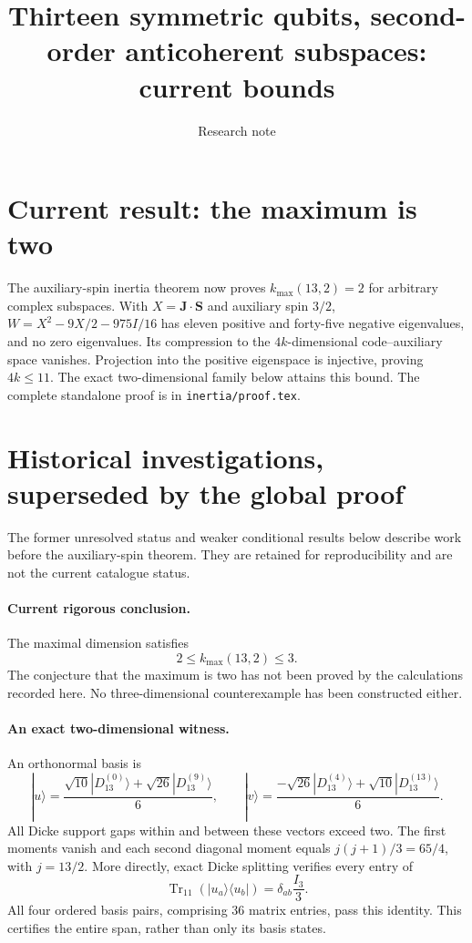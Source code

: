 \documentclass[11pt]{article}
\newcommand{\Tr}{\operatorname{Tr}}
\begin{document}
\section*{Current result: the maximum is two}
The auxiliary-spin inertia theorem now proves $k_{\max}(13,2)=2$ for arbitrary
complex subspaces. With $X=\mathbf J\cdot\mathbf S$ and auxiliary spin $3/2$,
$W=X^2-9X/2-975I/16$ has eleven positive and forty-five negative eigenvalues,
and no zero eigenvalues. Its compression to the $4k$-dimensional code--auxiliary
space vanishes. Projection into the positive eigenspace is injective, proving
$4k\le11$. The exact two-dimensional family below attains this bound.
The complete standalone proof is in \texttt{inertia/proof.tex}.
\section*{Historical investigations, superseded by the global proof}
The former unresolved status and weaker conditional results below describe work
before the auxiliary-spin theorem. They are retained for reproducibility and
are not the current catalogue status.

\title{Thirteen symmetric qubits, second-order anticoherent subspaces: current bounds}
\author{Research note}
\date{}
\maketitle

\paragraph{Current rigorous conclusion.}
The maximal dimension satisfies
\[
 \boxed{2\le k_{\max}(13,2)\le3.}
\]
The conjecture that the maximum is two has not been proved by the calculations recorded here. No three-dimensional counterexample has been constructed either.

\paragraph{An exact two-dimensional witness.}
An orthonormal basis is
\[
 |u\rangle=\frac{\sqrt{10}|D_{13}^{(0)}\rangle+\sqrt{26}|D_{13}^{(9)}\rangle}{6},
 \qquad
 |v\rangle=\frac{-\sqrt{26}|D_{13}^{(4)}\rangle+\sqrt{10}|D_{13}^{(13)}\rangle}{6}.
\]
All Dicke support gaps within and between these vectors exceed two. The first moments vanish and each second diagonal moment equals
$j(j+1)/3=65/4$, with $j=13/2$. More directly, exact Dicke splitting verifies every entry of
\[
 \Tr_{11}(|u_a\rangle\langle u_b|)=\delta_{ab}\frac{I_3}{3}.
\]
All four ordered basis pairs, comprising 36 matrix entries, pass this identity. This certifies the entire span, rather than only its basis states.
\end{document}
